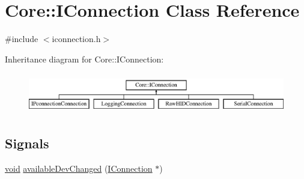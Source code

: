 \hypertarget{class_core_1_1_i_connection}{\section{\-Core\-:\-:\-I\-Connection \-Class \-Reference}
\label{class_core_1_1_i_connection}
}


{\ttfamily \#include $<$iconnection.\-h$>$}

\-Inheritance diagram for \-Core\-:\-:\-I\-Connection\-:\begin{figure}[H]
\begin{center}
\leavevmode
\includegraphics[height=1.783440cm]{class_core_1_1_i_connection}
\end{center}
\end{figure}
\subsection*{\-Signals}
\begin{DoxyCompactItemize}
\item 
\hyperlink{group___u_a_v_objects_plugin_ga444cf2ff3f0ecbe028adce838d373f5c}{void} \hyperlink{group___core_plugin_ga79b76e167c73d83f42b79f51f66a9c38}{available\-Dev\-Changed} (\hyperlink{class_core_1_1_i_connection}{\-I\-Connection} $\ast$)
\end{DoxyCompactItemize}
